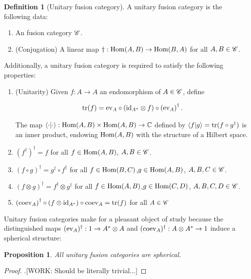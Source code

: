 \documentclass{article}
\newtheorem{proposition}{Proposition}[section]
\theoremstyle{definition}
\newtheorem*{definition}{Definition}
\numberwithin{figure}{section}
\begin{document}
\begin{definition}[Unitary fusion category] A unitary fusion category is the following data:

\begin{enumerate}
\item An fusion category $\mathscr{C}$.
\item (Conjugation) A linear map $\dagger: \mathrm{Hom}(A,B)\to \mathrm{Hom}(B,A)$ for all $A,B\in \mathscr{C}$.
\end{enumerate}

Additionally, a unitary fusion category is required to satisfy the following properties:

\begin{enumerate}
\item (Unitarity) Given $f:A\to A$ an endomorphism of $A\in \mathscr{C}$, define


$$\mathrm{tr}(f)=\mathrm{ev}_A \circ (\mathrm{id}_{A^*}\otimes f)\circ \left(\mathrm{ev}_A\right)^{\dagger}.$$

The map $\left<\cdot|\cdot\right>:\mathrm{Hom}(A,B)\times \mathrm{Hom}(A,B)\to \mathbb{C}$ defined by $\left<f|g\right>=\mathrm{tr}(f\circ g^{\dagger})$ is an inner product, endowing $\mathrm{Hom}(A,B)$ with the structure of a Hilbert space.
\item $\left(f^{\dagger}\right)^{\dagger}=f$ for all $f\in \mathrm{Hom}(A,B)$, $A,B\in \mathscr{C}$.
\item $(f\circ g)^{\dagger}=g^{\dagger}\circ f^{\dagger}$ for all $f\in \mathrm{Hom}(B,C)$,$g\in \mathrm{Hom}(A,B)$, $A,B,C\in \mathscr{C}$.
\item $(f\otimes g)^{\dagger}=f^{\dagger}\otimes g^{\dagger}$ for all $f\in \mathrm{Hom}(A,B)$,$g\in \mathrm{Hom}(C,D)$, $A,B,C,D\in \mathscr{C}$.
\item $\left(\mathrm{coev}_A\right)^{\dagger}\circ (f \otimes \mathrm{id}_{A^*})\circ \mathrm{coev}_A=\mathrm{tr}(f)$ for all $A\in \mathscr{C}$
\end{enumerate}

\raggedleft\qedsymbol{}
\end{definition}

Unitary fusion categories make for a pleasant object of study because the distinguished maps $(\mathrm{ev}_A)^{\dagger}:1\to A^{*}\otimes A$ and $(\mathrm{coev}_A)^{\dagger}:A\otimes A^{*}\to 1$ induce a spherical structure:

\begin{proposition} All unitary fusion categories are spherical.
\end{proposition}
\begin{proof}.[WORK: Should be literally trivial...]
\end{proof}
\end{document}
